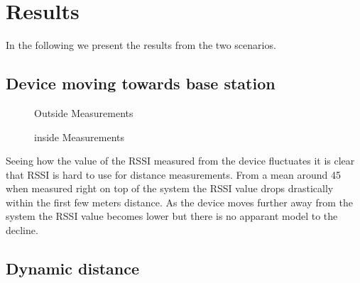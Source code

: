 \section{Results}
\label{sec_results}

In the following we present the results from the two scenarios.

\subsection{Device moving towards base station}

\begin{figure}		



\caption{ Outside Measurements }
\label{graf_OutsideMesurements}

\end{figure}

\begin{figure}		
	
	
	
	\caption{ inside Measurements }
	\label{graf_InsideMesurements}
	
\end{figure}

Seeing how the value of the RSSI measured from the device fluctuates it is clear that RSSI is hard to use for distance measurements. From a mean around 45 when measured right on top of the system the RSSI value drops drastically within the first few meters distance. As the device moves further away from the system the RSSI value becomes lower but there is no apparant model to the decline.

\subsection{Dynamic distance}
